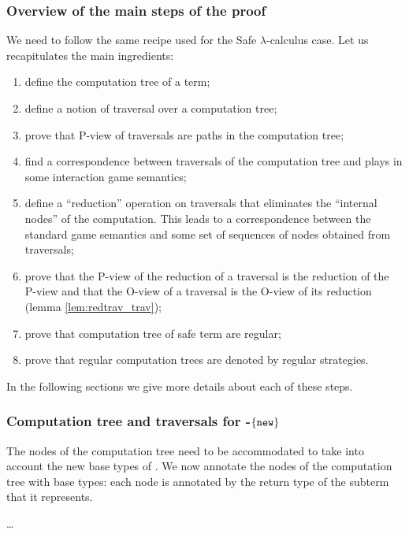 \subsubsection{Overview of the main steps of the proof}
We need to follow the same recipe used for the Safe $\lambda$-calculus case.
Let us recapitulates the main ingredients:
\begin{enumerate}
\item define the computation tree of a term;
\item define a notion of traversal over a computation tree;
\item prove that P-view of traversals are paths in the computation tree;
\item find a correspondence between traversals of the computation tree and plays in some interaction game semantics;
\item define a ``reduction'' operation on traversals that eliminates the ``internal nodes'' of the computation. This leads to a
correspondence between the standard game semantics and some set of sequences of nodes obtained from traversals;
\item prove that the P-view of the reduction of a traversal is the reduction of the P-view
and that the O-view of a traversal is the O-view of its reduction (lemma \ref{lem:redtrav_trav});
\item prove that computation tree of safe term are regular;
\item prove that regular computation trees are denoted by regular strategies.
\end{enumerate}

In the following sections we give more details about each of these steps.

\subsubsection{Computation tree and traversals for \ialgol-$\{\texttt{new}\}$ }

The nodes of the computation tree need to be accommodated to take into account the new base types of \ialgol.
We now annotate the nodes of the computation tree with base types: each node is annotated by the return type of the subterm
that it represents.

\ldots


